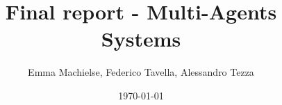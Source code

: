 \documentclass[a4paper]{article}
\title{Final report - Multi-Agents Systems}
\author{Emma Machielse, Federico Tavella, Alessandro Tezza}
\date{\today}
\begin{document}
\maketitle
















\newpage
\onecolumn



\end{document}
